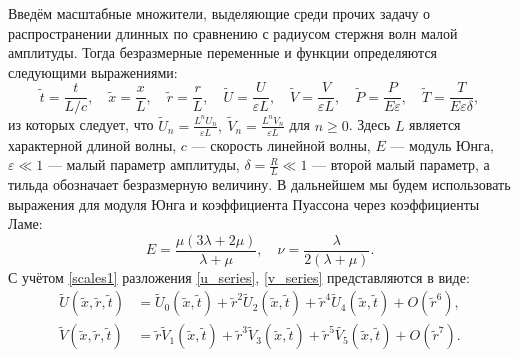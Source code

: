 \documentclass[12pt, a4paper]{report}
\begin{document}
Введём масштабные множители, выделяющие среди прочих задачу о распространении длинных по сравнению с радиусом стержня волн малой амплитуды. Тогда безразмерные переменные и функции определяются следующими выражениями:
\begin{equation} \label{scales1}
\tilde t = \frac{t}{L/c}, \quad \tilde x = \frac{x}{L}, \quad \tilde r = \frac{r}{L}, \quad \tilde U = \frac{U}{\varepsilon L}, \quad \tilde V = \frac{V}{\varepsilon L}, \quad \tilde P = \frac{P}{E \varepsilon}, \quad \tilde T = \frac{T}{E \varepsilon\delta},
\end{equation}
из которых следует, что
$\displaystyle \tilde U_n =  \frac{L^n U_n}{\varepsilon L},  \ \tilde V_n =  \frac{L^n V_n}{\varepsilon L}$ для $n \geqslant 0$.
Здесь $L$ является характерной длиной волны, $c$ --- скорость линейной волны, $E$ --- модуль Юнга, $\varepsilon \ll 1$ --- малый параметр амплитуды, $\displaystyle \delta = \frac{R}{L} \ll 1$ --- второй малый параметр, а тильда обозначает безразмерную величину. В дальнейшем мы будем использовать выражения для модуля Юнга и коэффициента Пуассона через коэффициенты Ламе:
\begin{equation}\label{young_mod}
E = \frac{\mu(3\lambda + 2\mu)}{\lambda + \mu}, \quad \nu = \frac{\lambda}{2 (\lambda + \mu)}.
\end{equation}
С учётом \eqref{scales1} разложения \eqref{u_series}, \eqref{v_series} представляются в виде:
\begin{align}
\label{u_series_scaled}
\widetilde U(\tilde x, \tilde r, \tilde t) &= \widetilde{U}_0(\tilde x, \tilde t) + \tilde{r}^2\widetilde{U}_2(\tilde x, \tilde t) + \tilde{r}^4\widetilde{U}_4(\tilde x, \tilde t) + O(\tilde r^6),\\
\label{v_series_scaled}
\widetilde V(\tilde x, \tilde r, \tilde t) &= \tilde{r} \widetilde{V}_1(\tilde x, \tilde t) + \tilde{r}^3\widetilde{V}_3(\tilde x, \tilde t) + \tilde{r}^5\widetilde{V_5}(\tilde x, \tilde t) + O(\tilde r^7).
\end{align}
\end{document}
